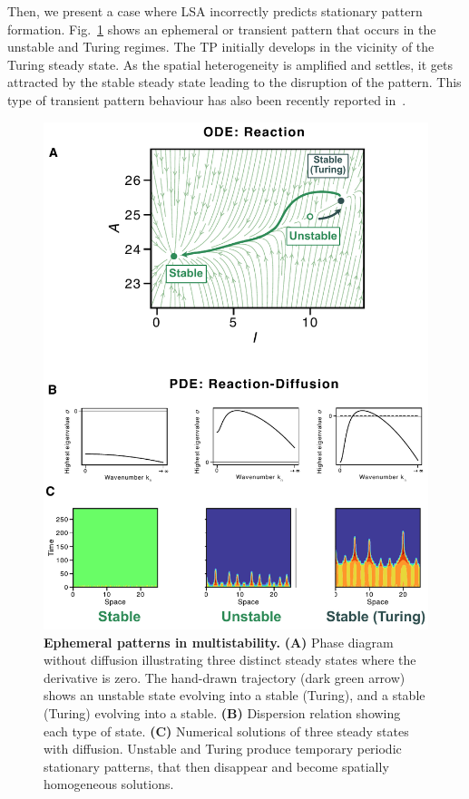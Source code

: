 Then, we present a case where LSA incorrectly predicts stationary pattern formation.
Fig.~\ref{fig:multistability2} shows an ephemeral or transient pattern that occurs in the unstable and Turing regimes.
The TP initially develops in the vicinity of the Turing steady state.
As the spatial heterogeneity is amplified and settles, it gets attracted by the stable steady state leading to the disruption of the pattern.
This type of transient pattern behaviour has also been recently reported in~\cite{Krause2023}.

\begin{figure}[H]
        \includegraphics[width=1\textwidth]{figures/multistability2} %
    \caption{\textbf{Ephemeral patterns in multistability.} \textbf{(A)} Phase diagram without diffusion illustrating three distinct steady states where the derivative is zero. The hand-drawn trajectory (dark green arrow) shows an unstable state evolving into a stable (Turing), and a stable (Turing) evolving into a stable. \textbf{(B)} Dispersion relation showing each type of state. \textbf{(C)} Numerical solutions of three steady states with diffusion. Unstable and Turing produce temporary periodic stationary patterns, that then disappear and become spatially homogeneous solutions.}
    \label{fig:multistability2} %
\end{figure}

